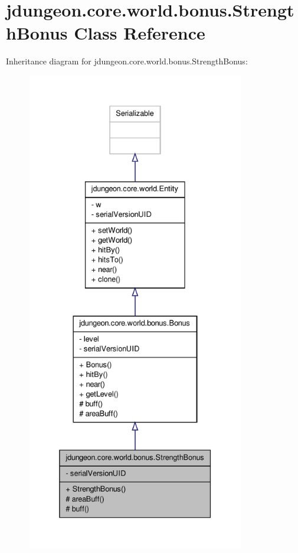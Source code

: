 \hypertarget{classjdungeon_1_1core_1_1world_1_1bonus_1_1_strength_bonus}{
\section{jdungeon.core.world.bonus.StrengthBonus Class Reference}
\label{classjdungeon_1_1core_1_1world_1_1bonus_1_1_strength_bonus}
}


Inheritance diagram for jdungeon.core.world.bonus.StrengthBonus:
\nopagebreak
\begin{figure}[H]
\begin{center}
\leavevmode
\includegraphics[height=600pt]{classjdungeon_1_1core_1_1world_1_1bonus_1_1_strength_bonus__inherit__graph}
\end{center}
\end{figure}


